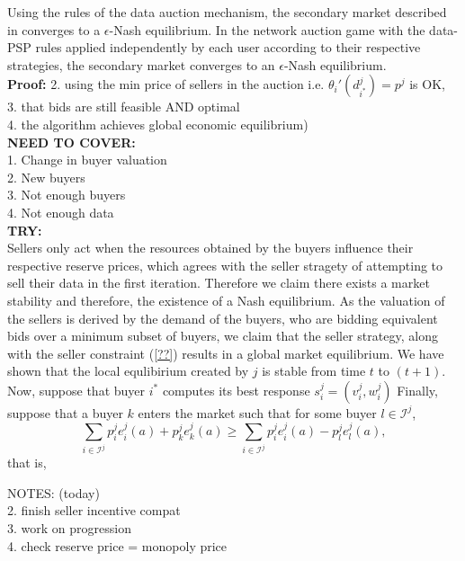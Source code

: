 \documentclass[12pt]{article}
\theoremstyle{definition}
\newcommand{\mcI}{\mathcal{I}}
\begin{document}
\begin{multicols}{2}
{
Using the rules of the data auction mechanism, the secondary market described in
\cite{zheng} converges to a $\epsilon$-Nash equilibrium. In the network auction
game with the data-PSP rules applied independently by each user according to their respective strategies, the secondary market converges to an $\epsilon$-Nash
equilibrium. 
}\\
\textbf{Proof:}
2. using the min price of sellers in the auction i.e. ${\theta_i}'(d_{i^*}^j) =
p^j$ is OK, \\
3. that bids are still feasible AND optimal \\
4. the algorithm achieves global economic equilibrium)\\
\textbf{NEED TO COVER:}\\
1. Change in buyer valuation \\
2. New buyers\\
3. Not enough buyers \\
4. Not enough data\\
\textbf{TRY:}\\
Sellers only act when the resources obtained by the buyers influence their
respective reserve prices, which agrees with the seller stragety of attempting
to sell their data in the first iteration. Therefore we claim there exists a
market stability and therefore, the existence of a Nash equilibrium. As the
valuation of the sellers is derived by the demand of the buyers, who are
bidding equivalent bids over a minimum subset of buyers, we claim that the seller
strategy, along with the seller constraint (\ref{??}) results in a global
market equilibrium.
We have shown that the local
equlibirium created by $j$ is stable from time $t$ to $(t+1)$. 
Now, suppose that buyer $i^*$ computes its best response $s_i^j = (v_i^j, w_i^j)$
Finally, suppose that
a buyer $k$ enters the market such that for some buyer $l\in\mcI^j$,
$$
    \displaystyle\sum_{i\in\mcI^j} p_i^je_i^j(a) + p_k^je_k^j(a) \ge
\sum_{i\in\mcI^j} p_i^je_i^j(a) - p_l^je_l^j(a),
$$
that is,



NOTES: (today)\\
2. finish seller incentive compat\\
3. work on progression\\
4. check reserve price = monopoly price



\end{multicols}
\end{document}
